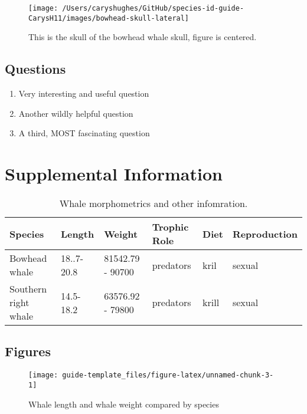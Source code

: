 \documentclass[
]{article}
\providecommand{\tightlist}{%
  \setlength{\itemsep}{0pt}\setlength{\parskip}{0pt}}
\begin{document}
\begin{figure}
\texttt{[image: /Users/caryshughes/GitHub/species-id-guide-CarysH11/images/bowhead-skull-lateral]} \caption{This is the skull of the bowhead whale skull, figure is centered.}\label{fig:bowhead-whale-skull-lateral}
\end{figure}

\newpage

\hypertarget{questions-1}{%
\subsection{Questions}\label{questions-1}}

\begin{enumerate}
\def\labelenumi{\arabic{enumi}.}
\tightlist
\item
  Very interesting and useful question
\item
  Another wildly helpful question
\item
  A third, MOST fascinating question
\end{enumerate}

\newpage

\hypertarget{supplemental-information}{%
\section{Supplemental Information}\label{supplemental-information}}

\begin{table}

\caption{\label{tab:unnamed-chunk-2}Whale morphometrics and other infomration.}
\centering
\begin{tabular}[t]{l|l|l|l|l|l}
\hline
Species & Length & Weight & Trophic Role & Diet & Reproduction\\
\hline
Bowhead whale & 18..7-20.8 & 81542.79 - 90700 & predators & kril & sexual\\
\hline
Southern right whale & 14.5-18.2 & 63576.92 - 79800 & predators & krill & sexual\\
\hline
\end{tabular}
\end{table}

\hypertarget{figures-2}{%
\subsection{Figures}\label{figures-2}}

\begin{figure}
\texttt{[image: guide-template\_files/figure-latex/unnamed-chunk-3-1]} \caption{Whale length and whale weight compared by species}\label{fig:unnamed-chunk-3}
\end{figure}
\end{document}
